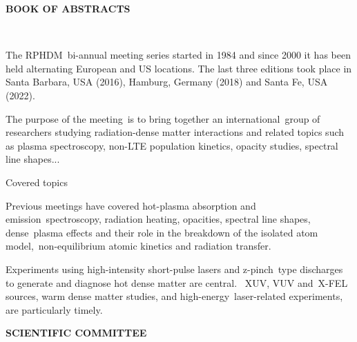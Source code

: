 \documentclass[11pt,a4paper]{report}
\begin{document}
\begin{center}
\begin{Huge}
\textbf{BOOK OF ABSTRACTS}
\end{Huge}\\
\par\vspace{7cm}
\end{center}

\newpage\thispagestyle{empty}
The RPHDM bi-annual meeting series started in 1984 and since 2000 it has been held alternating European and US locations. The last three editions took place in Santa Barbara, USA (2016), Hamburg, Germany (2018) and Santa Fe, USA (2022).

The purpose of the meeting is to bring together an international group of researchers studying radiation-dense matter interactions and related topics such as plasma spectroscopy, non-LTE population kinetics, opacity studies, spectral line shapes...


Covered topics

Previous meetings have covered hot-plasma absorption and emission spectroscopy, radiation heating, opacities, spectral line shapes, dense plasma effects and their role in the breakdown of the isolated atom model, non-equilibrium atomic kinetics and radiation transfer.

Experiments using high-intensity short-pulse lasers and z-pinch type discharges to generate and diagnose hot dense matter are central.  XUV, VUV and X-FEL sources, warm dense matter studies, and high-energy laser-related experiments, are particularly timely.



\newpage\thispagestyle{empty}
\begin{Large}
	{\bf SCIENTIFIC COMMITTEE}
\end{Large}
\end{document}
